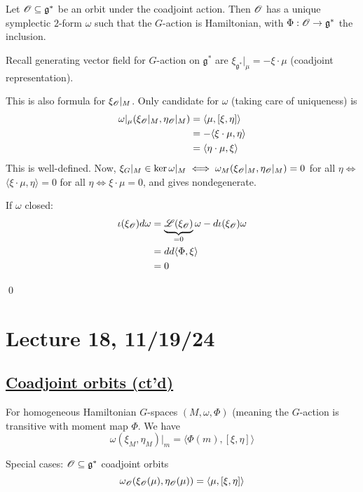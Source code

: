 \documentclass[x11names,reqno,14pt]{extarticle}
\newcommand{\mk}[1]{\mathfrak{#1}}
\newcommand{\g}{\mk{g}}
\begin{document}

Let $\ms{O}\subseteq\g^*$ be an orbit under the coadjoint action. Then $\mathscr{O}$ has a unique symplectic $2$-form $\omega$ such that the $G$-action is Hamiltonian, with $\Phi:\ms{O}\to\g^*$ the inclusion. 

\proof

Recall generating vector field for $G$-action on $\g^*$ are $\xi_{\g^*}|_{\mu} = -\xi\cdot\mu$ (coadjoint representation). 

This is also formula for $\xi_{\mathscr{O}}|_{M}$. Only candidate for $\omega$ (taking care of uniqueness) is
\begin{align*}
\omega|_{\mu}(\xi_{\mathscr{O}}|_{M}, \eta_{\mathscr{O}}|_{M}) & = \langle\mu,[\xi,\eta]\rangle\\
&=-\langle\xi\cdot\mu,\eta\rangle\\
&=\langle\eta\cdot\mu,\xi\rangle
\end{align*}
This is well-defined. Now, $\xi_G|_M\in\ker\omega|_M \iff \omega_M(\xi_{\mathscr{O}}|_M,\eta_{\mathscr{O}}|_M) = 0$ for all $\eta \iff$ $\langle\xi\cdot\mu,\eta\rangle=0$ for all $\eta \iff \xi\cdot\mu = 0$, and gives nondegenerate.

If $\omega$ closed:
\begin{align*}
\iota(\xi_{\mathscr{O}})d\omega & = \underbrace{\mathscr{L}(\xi_{\mathscr{O}})}_{=0}\omega-d\iota(\xi_{\mathscr{O}})\omega \\
& = dd\langle\Phi,\xi\rangle \\
& = 0
\end{align*}

\qed

\section*{Lecture 18, 11/19/24}

\subsection*{\underline{Coadjoint orbits (ct'd)}}

For homogeneous Hamiltonian $G$-spaces $(M,\omega,\Phi)$ (meaning the $G$-action is transitive with moment map $\Phi$. We have
\[
\omega(\xi_M,\eta_M)|_m = \langle\Phi(m),[\xi,\eta]\rangle
\]

Special cases: $\ms{O}\subseteq\g^*$ coadjoint orbits
\[
\omega_{\mathscr{O}}(\xi_{\mathscr{O}}(\mu),\eta_{\mathscr{O}}(\mu)) = \langle\mu,[\xi,\eta]\rangle
\]

\exm
\end{document}
